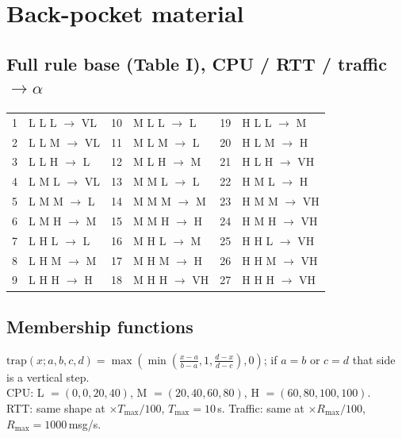 \documentclass[11pt]{article}
\begin{document}
\clearpage
\section*{Back-pocket material}
\subsection*{Full rule base (Table I), CPU / RTT / traffic $\rightarrow\alpha$}
{\small
\begin{tabular}{@{}rl@{\hspace{1.5em}}rl@{\hspace{1.5em}}rl@{}}
1 & L L L $\rightarrow$ VL & 10 & M L L $\rightarrow$ L & 19 & H L L $\rightarrow$ M\\
2 & L L M $\rightarrow$ VL & 11 & M L M $\rightarrow$ L & 20 & H L M $\rightarrow$ H\\
3 & L L H $\rightarrow$ L & 12 & M L H $\rightarrow$ M & 21 & H L H $\rightarrow$ VH\\
4 & L M L $\rightarrow$ VL & 13 & M M L $\rightarrow$ L & 22 & H M L $\rightarrow$ H\\
5 & L M M $\rightarrow$ L & 14 & M M M $\rightarrow$ M & 23 & H M M $\rightarrow$ VH\\
6 & L M H $\rightarrow$ M & 15 & M M H $\rightarrow$ H & 24 & H M H $\rightarrow$ VH\\
7 & L H L $\rightarrow$ L & 16 & M H L $\rightarrow$ M & 25 & H H L $\rightarrow$ VH\\
8 & L H M $\rightarrow$ M & 17 & M H M $\rightarrow$ H & 26 & H H M $\rightarrow$ VH\\
9 & L H H $\rightarrow$ H & 18 & M H H $\rightarrow$ VH & 27 & H H H $\rightarrow$ VH\\
\end{tabular}}

\subsection*{Membership functions}
{\small
$\mathrm{trap}(x;a,b,c,d)=\max(\min(\frac{x-a}{b-a},1,\frac{d-x}{d-c}),0)$; if $a=b$ or $c=d$ that side is a vertical step.\\
CPU: L $=(0,0,20,40)$, M $=(20,40,60,80)$, H $=(60,80,100,100)$.\\
RTT: same shape at $\times T_{\max}/100$, $T_{\max}=10$\,s. \quad Traffic: same at $\times R_{\max}/100$, $R_{\max}=1000$\,msg/s.}
\end{document}
